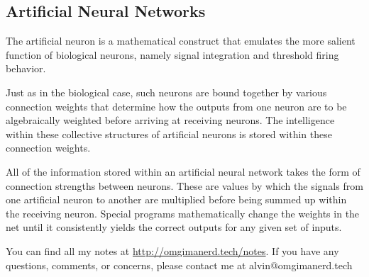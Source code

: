 \documentclass{math}
\begin{document}
\subsection*{Artificial Neural Networks}
The artificial neuron is a mathematical construct that emulates the more
salient function of biological neurons, namely signal integration and threshold
firing behavior. \par
Just as in the biological case, such neurons are bound together by various
connection weights that determine how the outputs from one neuron are to be
algebraically weighted before arriving at receiving neurons. The intelligence
within these collective structures of artificial neurons is stored within these
connection weights. \par
All of the information stored within an artificial neural network takes the
form of connection strengths between neurons. These are values by which the
signals from one artificial neuron to another are multiplied before being summed
up within the receiving neuron. Special programs mathematically change the
weights in the net until it consistently yields the correct outputs for any
given set of inputs.

\begin{center}
  You can find all my notes at \url{http://omgimanerd.tech/notes}. If you have
  any questions, comments, or concerns, please contact me at
  alvin@omgimanerd.tech
\end{center}
\end{document}
